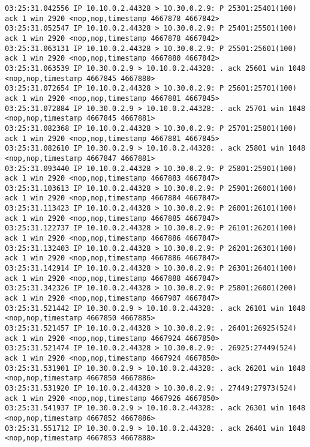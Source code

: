 \documentclass[a4paper,12pt]{article}
\begin{document}
\begin{Verbatim}
03:25:31.042556 IP 10.10.0.2.44328 > 10.30.0.2.9: P 25301:25401(100) ack 1 win 2920 <nop,nop,timestamp 4667878 4667842>
03:25:31.052547 IP 10.10.0.2.44328 > 10.30.0.2.9: P 25401:25501(100) ack 1 win 2920 <nop,nop,timestamp 4667878 4667842>
03:25:31.063131 IP 10.10.0.2.44328 > 10.30.0.2.9: P 25501:25601(100) ack 1 win 2920 <nop,nop,timestamp 4667880 4667842>
03:25:31.063539 IP 10.30.0.2.9 > 10.10.0.2.44328: . ack 25601 win 1048 <nop,nop,timestamp 4667845 4667880>
03:25:31.072654 IP 10.10.0.2.44328 > 10.30.0.2.9: P 25601:25701(100) ack 1 win 2920 <nop,nop,timestamp 4667881 4667845>
03:25:31.072884 IP 10.30.0.2.9 > 10.10.0.2.44328: . ack 25701 win 1048 <nop,nop,timestamp 4667845 4667881>
03:25:31.082368 IP 10.10.0.2.44328 > 10.30.0.2.9: P 25701:25801(100) ack 1 win 2920 <nop,nop,timestamp 4667881 4667845>
03:25:31.082610 IP 10.30.0.2.9 > 10.10.0.2.44328: . ack 25801 win 1048 <nop,nop,timestamp 4667847 4667881>
03:25:31.093440 IP 10.10.0.2.44328 > 10.30.0.2.9: P 25801:25901(100) ack 1 win 2920 <nop,nop,timestamp 4667883 4667847>
03:25:31.103613 IP 10.10.0.2.44328 > 10.30.0.2.9: P 25901:26001(100) ack 1 win 2920 <nop,nop,timestamp 4667884 4667847>
03:25:31.113423 IP 10.10.0.2.44328 > 10.30.0.2.9: P 26001:26101(100) ack 1 win 2920 <nop,nop,timestamp 4667885 4667847>
03:25:31.122737 IP 10.10.0.2.44328 > 10.30.0.2.9: P 26101:26201(100) ack 1 win 2920 <nop,nop,timestamp 4667886 4667847>
03:25:31.132403 IP 10.10.0.2.44328 > 10.30.0.2.9: P 26201:26301(100) ack 1 win 2920 <nop,nop,timestamp 4667886 4667847>
03:25:31.142914 IP 10.10.0.2.44328 > 10.30.0.2.9: P 26301:26401(100) ack 1 win 2920 <nop,nop,timestamp 4667888 4667847>
03:25:31.342326 IP 10.10.0.2.44328 > 10.30.0.2.9: P 25801:26001(200) ack 1 win 2920 <nop,nop,timestamp 4667907 4667847>
03:25:31.521442 IP 10.30.0.2.9 > 10.10.0.2.44328: . ack 26101 win 1048 <nop,nop,timestamp 4667850 4667885>
03:25:31.521457 IP 10.10.0.2.44328 > 10.30.0.2.9: . 26401:26925(524) ack 1 win 2920 <nop,nop,timestamp 4667924 4667850>
03:25:31.521474 IP 10.10.0.2.44328 > 10.30.0.2.9: . 26925:27449(524) ack 1 win 2920 <nop,nop,timestamp 4667924 4667850>
03:25:31.531901 IP 10.30.0.2.9 > 10.10.0.2.44328: . ack 26201 win 1048 <nop,nop,timestamp 4667850 4667886>
03:25:31.531920 IP 10.10.0.2.44328 > 10.30.0.2.9: . 27449:27973(524) ack 1 win 2920 <nop,nop,timestamp 4667926 4667850>
03:25:31.541937 IP 10.30.0.2.9 > 10.10.0.2.44328: . ack 26301 win 1048 <nop,nop,timestamp 4667852 4667886>
03:25:31.551712 IP 10.30.0.2.9 > 10.10.0.2.44328: . ack 26401 win 1048 <nop,nop,timestamp 4667853 4667888>

\end{Verbatim}
\end{document}
